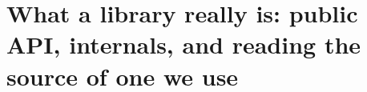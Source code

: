 \chapter{What a library really is: public API, internals, and reading the source of one we use}
\label{ch:what-a-library-really-is-public-api}

